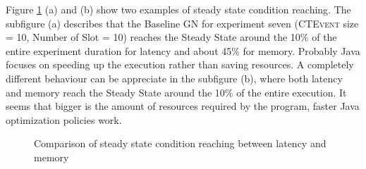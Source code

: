 Figure \ref{fig:level3-steady-naive-graph-en7-12} (a) and (b) show two examples of steady state condition reaching. The subfigure (a) describes that the Baseline GN for experiment seven (\textsc{CTEvent} size = 10, Number of Slot = 10) reaches the Steady State around the 10\% of the entire experiment duration for latency and about 45\% for memory. 
Probably Java focuses on speeding up the execution rather than saving resources. A completely different behaviour can be appreciate in the subfigure (b), where both latency and memory reach the Steady State around the 10\% of the entire execution. It seems that bigger is the amount of resources required by the program, faster Java optimization policies work.


\begin{figure}[tbh]
  \centering
  	\label{fig:level3-steady-naive-graph-en7-12}  	
  	\caption[\textsc{Analyser} Investigation Stack - Level 3 - Intra Experiment Comparison - SOAK Test Latency vs Memory Steady State Reaching]{Comparison of steady state condition reaching between latency and memory} 
\end{figure}

